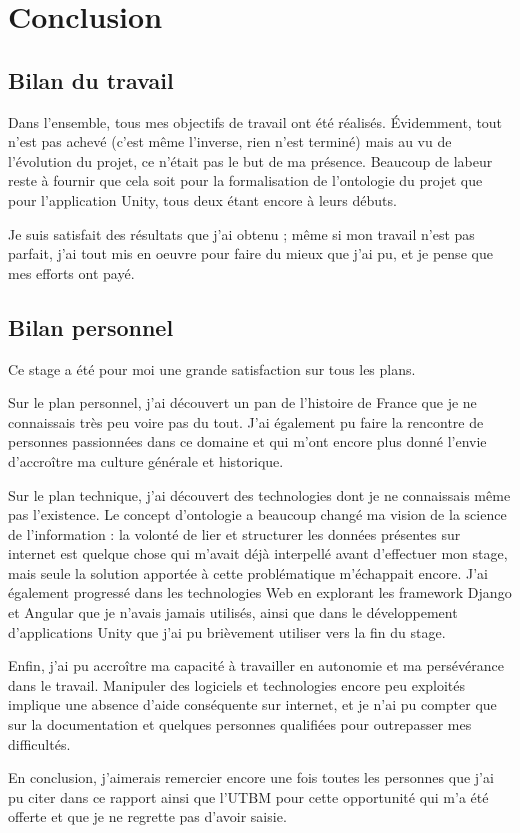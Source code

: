 \chapter*{Conclusion}

\section*{Bilan du travail}
Dans l'ensemble, tous mes objectifs de travail ont été réalisés. Évidemment, tout n'est pas achevé (c'est même l'inverse, rien n'est terminé) mais au vu de l'évolution du projet, ce n'était pas le but de ma présence. Beaucoup de labeur reste à fournir que cela soit pour la formalisation de l'ontologie du projet que pour l'application Unity, tous deux étant encore à leurs débuts.

\vspace{5mm}
Je suis satisfait des résultats que j'ai obtenu ; même si mon travail n'est pas parfait, j'ai tout mis en oeuvre pour faire du mieux que j'ai pu, et je pense que mes efforts ont payé.

\section*{Bilan personnel}

Ce stage a été pour moi une grande satisfaction sur tous les plans.

Sur le plan personnel, j'ai découvert un pan de l'histoire de France que je ne connaissais très peu voire pas du tout. J'ai également pu faire la rencontre de personnes passionnées dans ce domaine et qui m'ont encore plus donné l'envie d'accroître ma culture générale et historique.

Sur le plan technique, j'ai découvert des technologies dont je ne connaissais même pas l'existence. Le concept d'ontologie a beaucoup changé ma vision de la science de l'information : la volonté de lier et structurer les données présentes sur internet est quelque chose qui m'avait déjà interpellé avant d'effectuer mon stage, mais seule la solution apportée à cette problématique m'échappait encore. J'ai également progressé dans les technologies Web en explorant les framework Django et Angular que je n'avais jamais utilisés, ainsi que dans le développement d'applications Unity que j'ai pu brièvement utiliser vers la fin du stage.

Enfin, j'ai pu accroître ma capacité à travailler en autonomie et ma persévérance dans le travail. Manipuler des logiciels et technologies encore peu exploités implique une absence d'aide conséquente sur internet, et je n'ai pu compter que sur la documentation et quelques personnes qualifiées pour outrepasser mes difficultés.

En conclusion, j'aimerais remercier encore une fois toutes les personnes que j'ai pu citer dans ce rapport ainsi que l'UTBM pour cette opportunité qui m'a été offerte et que je ne regrette pas d'avoir saisie.